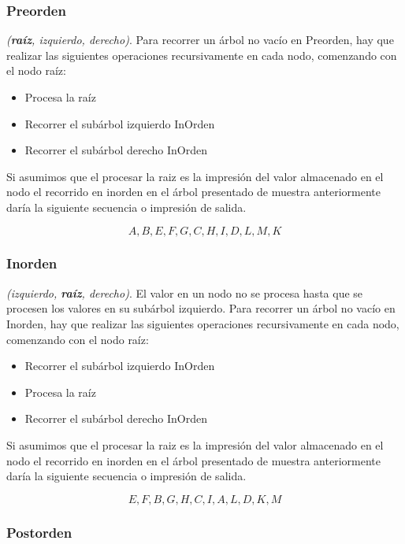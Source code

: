 \subsubsection{Preorden}

\emph{(\textbf{raíz}, izquierdo, derecho)}. Para recorrer un árbol no vacío en Preorden, hay que realizar
las siguientes operaciones recursivamente en cada nodo, comenzando con el nodo raíz:

\begin{itemize}
	\item Procesa la raíz
	\item Recorrer el subárbol izquierdo InOrden
	\item Recorrer el subárbol derecho InOrden
\end{itemize}

Si asumimos que el procesar la raiz es la impresión del valor almacenado en el nodo el recorrido en inorden en el árbol presentado de muestra anteriormente daría la siguiente secuencia o impresión de salida.

$$ A, B,E,F,G,C,H,I,D,L,M,K $$

\subsubsection{Inorden}

\emph{(izquierdo, \textbf{raíz}, derecho)}. El valor en un nodo no se procesa hasta que se procesen los valores en
su subárbol izquierdo.
Para recorrer un árbol no vacío en Inorden, hay que realizar las siguientes operaciones
recursivamente en cada nodo, comenzando con el nodo raíz:

\begin{itemize}
	\item Recorrer el subárbol izquierdo InOrden
	\item Procesa la raíz
	\item Recorrer el subárbol derecho InOrden
\end{itemize}

Si asumimos que el procesar la raiz es la impresión del valor almacenado en el nodo el recorrido en inorden en el árbol presentado de muestra anteriormente daría la siguiente secuencia o impresión de salida.

$$ E,F,B,G,H,C,I,A,L,D,K,M $$

\subsubsection{Postorden}

